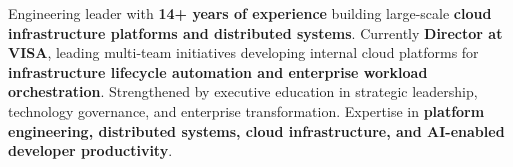 Engineering leader with \textbf{14+ years of experience} building large-scale \textbf{cloud infrastructure platforms and distributed systems}. 
Currently \textbf{Director at VISA}, leading multi-team initiatives developing internal cloud platforms for \textbf{infrastructure lifecycle automation and enterprise workload orchestration}.
Strengthened by executive education in strategic leadership, technology governance, and enterprise transformation.
Expertise in \textbf{platform engineering, distributed systems, cloud infrastructure, and AI-enabled developer productivity}.